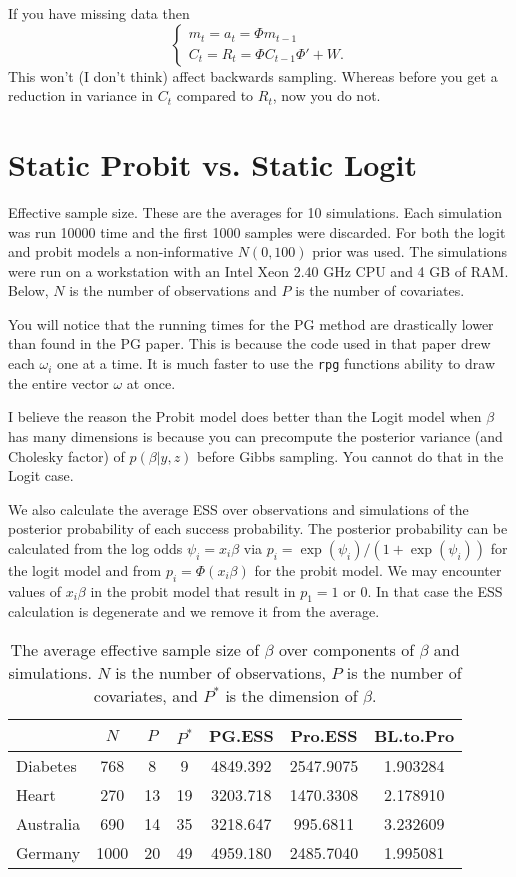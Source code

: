 \documentclass{article}
\begin{document}
If you have missing data then
\[
\begin{cases}
m_t = a_t = \Phi m_{t-1} \\
C_t = R_t = \Phi C_{t-1} \Phi' + W.
\end{cases}
\]
This won't (I don't think) affect backwards sampling.  Whereas before you get a
reduction in variance in $C_t$ compared to $R_t$, now you do not.

\section{Static Probit vs. Static Logit}

Effective sample size.  These are the averages for 10 simulations.  Each
simulation was run 10000 time and the first 1000 samples were discarded.  For
both the logit and probit models a non-informative $N(0, 100)$ prior was used.
The simulations were run on a workstation with an Intel Xeon 2.40 GHz CPU and 4
GB of RAM.  Below, $N$ is the number of observations and $P$ is the number of
covariates.

You will notice that the running times for the PG method are drastically lower
than found in the PG paper.  This is because the code used in that paper drew
each $\omega_i$ one at a time.  It is much faster to use the \texttt{rpg}
functions ability to draw the entire vector $\omega$ at once.

I believe the reason the Probit model does better than the Logit model when
$\beta$ has many dimensions is because you can precompute the posterior variance
(and Cholesky factor) of $p(\beta | y, z)$ before Gibbs sampling.  You cannot do
that in the Logit case.

We also calculate the average ESS over observations and simulations of the
posterior probability of each success probability.  The posterior probability
can be calculated from the log odds $\psi_i = x_i \beta$ via $p_i = \exp(\psi_i)
/ (1 + \exp(\psi_i))$ for the logit model and from $p_i = \Phi(x_i \beta)$ for
the probit model.  We may encounter values of $x_i \beta$ in the probit model
that result in $p_1 = 1$ or $0$.  In that case the ESS calculation is degenerate
and we remove it from the average.

\begin{table}
\centering
\begin{tabular}{l c c c c c c}
          & $N$  & $P$ & $P^*$ & PG.ESS   &  Pro.ESS  & BL.to.Pro \\
\hline
Diabetes  & 768  & 8   & 9  & 4849.392 & 2547.9075 & 1.903284  \\
Heart     & 270  & 13  & 19 & 3203.718 & 1470.3308 & 2.178910  \\
Australia & 690  & 14  & 35 & 3218.647 &  995.6811 & 3.232609  \\
Germany   & 1000 & 20  & 49 & 4959.180 & 2485.7040 & 1.995081  \\
\end{tabular}
\caption{The average effective sample size of $\beta$ over components of $\beta$ and 
  simulations.  $N$ is the number of observations, $P$ is the
  number of covariates, and $P^*$ is the dimension of $\beta$.}
\end{table}
\end{document}
